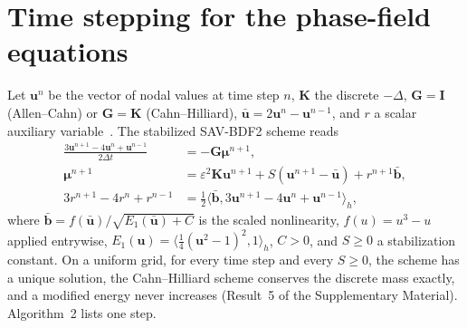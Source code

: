 \section{Time stepping for the phase-field equations}\label{app:sav}
Let $\mathbf u^n$ be the vector of nodal values at time step $n$, $\mathbf K$ the discrete $-\Delta$, $\mathbf G=\mathbf I$ (Allen--Cahn) or $\mathbf G=\mathbf K$ (Cahn--Hilliard), $\bar{\mathbf u}=2\mathbf u^n-\mathbf u^{n-1}$, and
$r$ a scalar auxiliary variable~\cite{shen2018scalar}. The stabilized SAV-BDF2 scheme reads
\begin{align}
\frac{3\mathbf u^{n+1}-4\mathbf u^n+\mathbf u^{n-1}}{2\Delta t}&=-\mathbf G\boldsymbol\mu^{n+1},\label{eq:sav1}\\
\boldsymbol\mu^{n+1}&=\varepsilon^2\mathbf K\mathbf u^{n+1}+S(\mathbf u^{n+1}-\bar{\mathbf u})+r^{n+1}\bar{\mathbf b},\label{eq:sav1b}\\
3r^{n+1}-4r^n+r^{n-1}&=\tfrac12\langle\bar{\mathbf b},3\mathbf u^{n+1}-4\mathbf u^n+\mathbf u^{n-1}\rangle_h,\label{eq:sav2}
\end{align}
where $\bar{\mathbf b}=f(\bar{\mathbf u})/\sqrt{E_1(\bar{\mathbf u})+C}$ is the scaled nonlinearity, $f(u)=u^3-u$ applied entrywise,
$E_1(\mathbf u)=\langle\frac14(\mathbf u^2-1)^2,1\rangle_h$, $C>0$, and $S\ge0$ a stabilization constant. On a uniform
grid, for every time step and every $S\ge0$, the scheme has a unique solution, the Cahn--Hilliard scheme
conserves the discrete mass exactly, and a modified energy never increases (Result~5 of the Supplementary
Material). Algorithm~2 lists one step.

